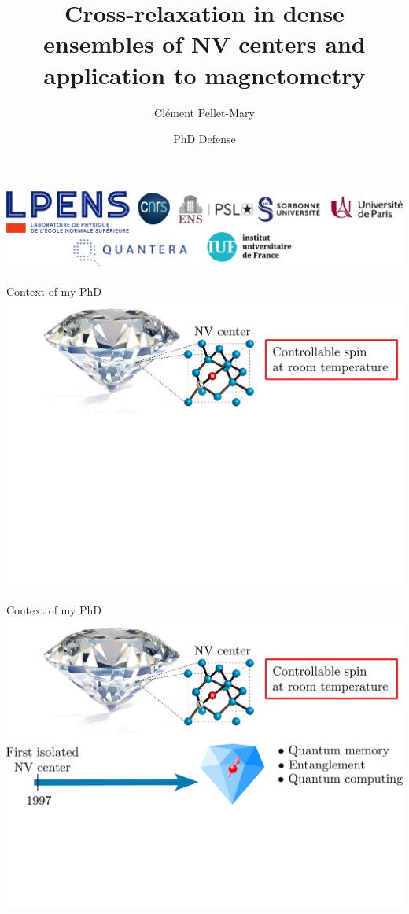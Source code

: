 \documentclass{beamer}
\title[PhD Defense]{Cross-relaxation in dense ensembles of NV centers and
application to magnetometry}
\author{Clément Pellet-Mary}
\date{PhD Defense}
\begin{document}
\begin{frame}
\maketitle
\begin{center}
\includegraphics[width=\textwidth,height=0.3\textheight,keepaspectratio]{logos}
\end{center}
\end{frame}

\begin{frame}{Context of my PhD}
\centering
\includegraphics[width=\textwidth,height=0.85\textheight,keepaspectratio]{Slide_contexte_f-4}
\end{frame}

\begin{frame}{Context of my PhD}
\centering
\includegraphics[width=\textwidth,height=0.85\textheight,keepaspectratio]{Slide_contexte_f-3}
\end{frame}
\end{document}
